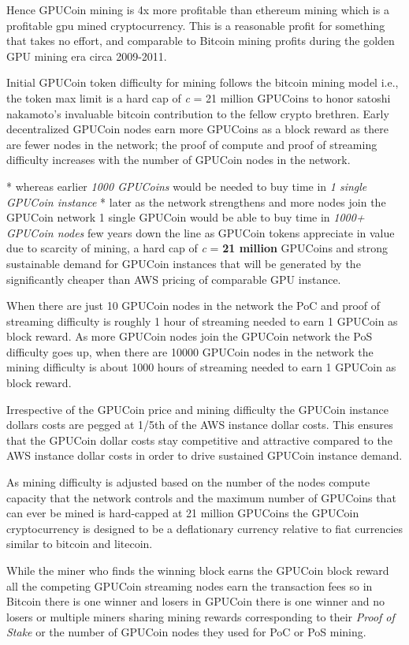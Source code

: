 Hence GPUCoin mining is 4x more profitable than ethereum mining which is a profitable gpu mined cryptocurrency. This is a reasonable profit for something that takes no effort, and comparable to Bitcoin mining profits during the golden GPU mining era circa 2009-2011.

Initial GPUCoin token difficulty for mining follows the bitcoin mining model i.e., the token max limit is a hard cap of \emph{c} = 21 million GPUCoins to honor satoshi nakamoto’s invaluable bitcoin contribution to the fellow crypto brethren. Early decentralized GPUCoin nodes earn more GPUCoins as a block reward as there are fewer nodes in the network; the proof of compute and proof of streaming difficulty increases with the number of GPUCoin nodes in the network.

* whereas earlier \emph{1000 GPUCoins} would be needed to buy time in \emph{1 single GPUCoin instance}
* later as the network strengthens and more nodes join the GPUCoin network 1 single GPUCoin would be able to buy time in \emph{1000+ GPUCoin nodes} few years down the line as GPUCoin tokens appreciate in value due to scarcity of mining, a hard cap of \emph{c} = \textbf{21 million} GPUCoins and strong sustainable demand for GPUCoin instances that will be generated by the significantly cheaper than AWS pricing of comparable GPU instance.

When there are just 10 GPUCoin nodes in the network the PoC and proof of streaming difficulty is roughly 1 hour of streaming needed to earn 1 GPUCoin as block reward. As more GPUCoin nodes join the GPUCoin network the PoS difficulty goes up, when there are 10000 GPUCoin nodes in the network the mining difficulty is about 1000 hours of streaming needed to earn 1 GPUCoin as block reward.

Irrespective of the GPUCoin price and mining difficulty the GPUCoin instance dollars costs are pegged at 1/5th of the AWS instance dollar costs. This ensures that the GPUCoin dollar costs stay competitive and attractive compared to the AWS instance dollar costs in order to drive sustained GPUCoin instance demand.

As mining difficulty is adjusted based on the number of the nodes compute capacity that the network controls and the maximum number of GPUCoins that can ever be mined is hard-capped at 21 million GPUCoins the GPUCoin cryptocurrency is designed to be a deflationary currency relative to fiat currencies similar to bitcoin and litecoin.

While the miner who finds the winning block earns the GPUCoin block reward all the competing GPUCoin streaming nodes earn the transaction fees so in Bitcoin there is one winner and losers in GPUCoin there is one winner and no losers or multiple miners sharing mining rewards corresponding to their \emph{Proof of Stake} or the number of GPUCoin nodes they used for PoC or PoS mining.
